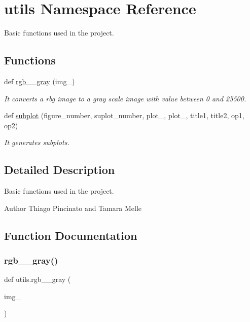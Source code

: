\hypertarget{namespaceutils}{}\section{utils Namespace Reference}
\label{namespaceutils}


Basic functions used in the project.  


\subsection*{Functions}
\begin{DoxyCompactItemize}
\item 
def \hyperlink{namespaceutils_a1978227653c87ec56ae96b62d922ff2e}{rgb\+\_\+\_\+gray} (img\+\_\+)
\begin{DoxyCompactList}\small\item\em It converts a rbg image to a gray scale image with value between 0 and 25500. \end{DoxyCompactList}\item 
def \hyperlink{namespaceutils_adf95054b4f2cc322619a70a7947c6224}{subplot} (figure\+\_\+number, suplot\+\_\+number, plot\+\_, plot\+\_, title1, title2, op1, op2)
\begin{DoxyCompactList}\small\item\em It generates subplots. \end{DoxyCompactList}\end{DoxyCompactItemize}


\subsection{Detailed Description}
Basic functions used in the project. 

\begin{DoxyAuthor}{Author}
Thiago Pincinato and Tamara Melle 
\end{DoxyAuthor}


\subsection{Function Documentation}
\mbox{\label{namespaceutils_a1978227653c87ec56ae96b62d922ff2e}} 
\subsubsection{\texorpdfstring{rgb\+\_\+\_\+gray()}{rgb\_2\_gray()}}
{\footnotesize\ttfamily def utils.\+rgb\+\_\+\_\+gray (\begin{DoxyParamCaption}\item[{}]{img\+\_\+ }\end{DoxyParamCaption})}



